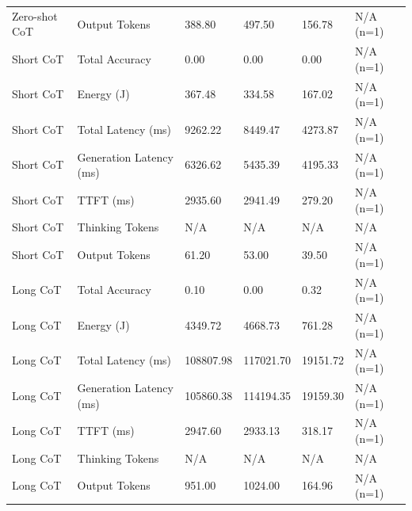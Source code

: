 \begin{table}
\begin{tabular}{llllll}
Zero-shot CoT & Output Tokens & 388.80 & 497.50 & 156.78 & N/A (n=1) \\
Short CoT & Total Accuracy & 0.00 & 0.00 & 0.00 & N/A (n=1) \\
Short CoT & Energy (J) & 367.48 & 334.58 & 167.02 & N/A (n=1) \\
Short CoT & Total Latency (ms) & 9262.22 & 8449.47 & 4273.87 & N/A (n=1) \\
Short CoT & Generation Latency (ms) & 6326.62 & 5435.39 & 4195.33 & N/A (n=1) \\
Short CoT & TTFT (ms) & 2935.60 & 2941.49 & 279.20 & N/A (n=1) \\
Short CoT & Thinking Tokens & N/A & N/A & N/A & N/A \\
Short CoT & Output Tokens & 61.20 & 53.00 & 39.50 & N/A (n=1) \\
Long CoT & Total Accuracy & 0.10 & 0.00 & 0.32 & N/A (n=1) \\
Long CoT & Energy (J) & 4349.72 & 4668.73 & 761.28 & N/A (n=1) \\
Long CoT & Total Latency (ms) & 108807.98 & 117021.70 & 19151.72 & N/A (n=1) \\
Long CoT & Generation Latency (ms) & 105860.38 & 114194.35 & 19159.30 & N/A (n=1) \\
Long CoT & TTFT (ms) & 2947.60 & 2933.13 & 318.17 & N/A (n=1) \\
Long CoT & Thinking Tokens & N/A & N/A & N/A & N/A \\
Long CoT & Output Tokens & 951.00 & 1024.00 & 164.96 & N/A (n=1) \\
\bottomrule
\end{tabular}
\end{table}
